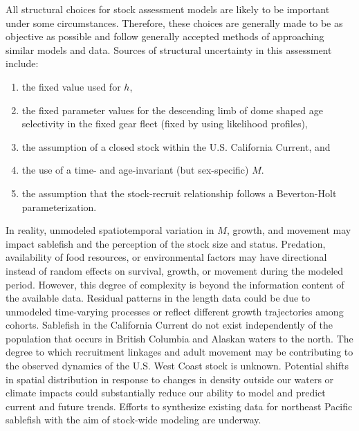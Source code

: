 \documentclass[11pt,
  english,
  a4paper,
]{article}
\begin{document}
\leavevmode\tagmcend\tagstructend

All structural choices for stock assessment models are likely to be important under some circumstances. Therefore, these choices are generally made to be as objective as possible and follow generally accepted methods of approaching similar models and data. Sources of structural uncertainty in this assessment include:

\begin{enumerate}
\item the fixed value used for $h$,
\item  the fixed parameter values for the descending limb of dome shaped age selectivity in the fixed gear fleet (fixed by using likelihood profiles),
\item the assumption of a closed stock within the U.S. California Current, and
\item the use of a time- and age-invariant (but sex-specific) $M$.
\item the assumption that the stock-recruit relationship follows a Beverton-Holt parameterization.
\end{enumerate}


In reality, unmodeled spatiotemporal variation in {\(M\)\leavevmode\tagmcend\tagstructend}, growth, and movement may impact sablefish and the perception of the stock size and status. Predation, availability of food resources, or environmental factors may have directional instead of random effects on survival, growth, or movement during the modeled period. However, this degree of complexity is beyond the information content of the available data. Residual patterns in the length data could be due to unmodeled time-varying processes or reflect different growth trajectories among cohorts. Sablefish in the California Current do not exist independently of the population that occurs in British Columbia and Alaskan waters to the north. The degree to which recruitment linkages and adult movement may be contributing to the observed dynamics of the U.S. West Coast stock is unknown. Potential shifts in spatial distribution in response to changes in density outside our waters or climate impacts could substantially reduce our ability to model and predict current and future trends. Efforts to synthesize existing data for northeast Pacific sablefish with the aim of stock-wide modeling are underway.

\leavevmode\tagmcend\tagstructend\par
\end{document}
